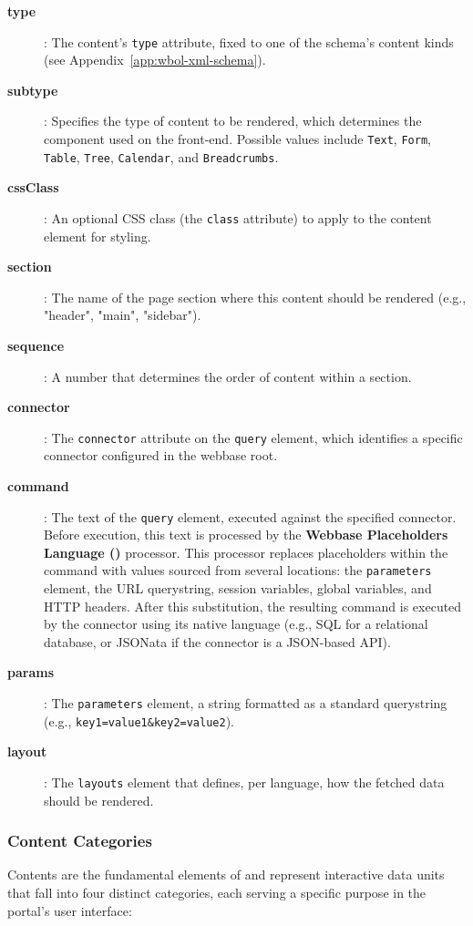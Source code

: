 \begin{description}
\item[\textbf{type}]: The content's \texttt{type} attribute, fixed to one of the schema's content kinds (see Appendix~\ref{app:wbol-xml-schema}).
\item[\textbf{subtype}]: Specifies the type of content to be rendered, which determines the component used on the front-end. Possible values include \texttt{Text}, \texttt{Form}, \texttt{Table}, \texttt{Tree}, \texttt{Calendar}, and \texttt{Breadcrumbs}.
\item[\textbf{cssClass}]: An optional CSS class (the \texttt{class} attribute) to apply to the content element for styling.
\item[\textbf{section}]: The name of the page section where this content should be rendered (e.g., "header", "main", "sidebar").
\item[\textbf{sequence}]: A number that determines the order of content within a section.
\item[\textbf{connector}]: The \texttt{connector} attribute on the \texttt{query} element, which identifies a specific connector configured in the webbase root.
\item[\textbf{command}]: The text of the \texttt{query} element, executed against the specified connector. Before execution, this text is processed by the \textbf{Webbase Placeholders Language (\wbpl{})} processor. This processor replaces placeholders within the command with values sourced from several locations: the \texttt{parameters} element, the URL querystring, session variables, global variables, and HTTP headers. After this substitution, the resulting command is executed by the connector using its native language (e.g., SQL for a relational database, or JSONata if the connector is a JSON-based API).
\item[\textbf{params}]: The \texttt{parameters} element, a string formatted as a standard querystring (e.g., \texttt{key1=value1\&key2=value2}).
\item[\textbf{layout}]: The \texttt{layouts} element that defines, per language, how the fetched data should be rendered.
\end{description}

\subsubsection{Content Categories}
\label{sec:content-categories}

Contents are the fundamental elements of \wbol{} and represent interactive data units that fall into four distinct categories, each serving a specific purpose in the portal's user interface:


